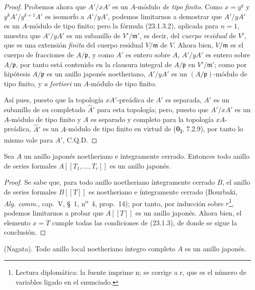 \begin{proof}
Probemos ahora que $A'/xA'$ es un $A$-módulo \emph{de tipo finito}. Como $x=y^q$
y $y^kA'/y^{k+1}A'$ es isomorfo a $A'/yA'$, podemos limitarnos a
demostrar que $A'/yA'$ es un $A$-módulo de tipo finito; pero la fórmula
(23.1.3.2), aplicada para $n=1$, muestra que $A'/yA'$ es un subanillo de
$V'/\mathfrak m'$, es decir, del \emph{cuerpo residual} de $V'$, que es una
extensión \emph{finita} del cuerpo residual $V/\mathfrak m$ de $V$. Ahora bien,
$V/\mathfrak m$ es el cuerpo de fracciones de $A/\mathfrak p$, y como
$A'$ es entero sobre $A$, $A'/yA'$ es entero sobre $A/\mathfrak p$, por tanto
está contenido en la clausura integral de $A/\mathfrak p$ en
$V'/\mathfrak m'$; como por hipótesis $A/\mathfrak p$ es un anillo
japonés noetheriano, $A'/yA'$ es un $(A/\mathfrak p)$-módulo de tipo finito,
y \emph{a fortiori} un $A$-módulo de tipo finito.

Así pues, puesto que la topología $xA'$-preádica de $A'$ es separada, $A'$ es un
subanillo de su completado $\widehat A'$ para esta topología; pero, puesto que
$A'/xA'$ es un $A$-módulo de tipo finito y $A$ es separado y completo para
la topología $xA$-preádica, $\widehat A'$ es un $A$-módulo de tipo finito en
virtud de (\textbf{0}\textsubscript{I}, 7.2.9), por tanto lo mismo vale para $A'$, C.Q.D.
\end{proof}

\begin{corollary}[23.1.4]
\label{0.23.1.4-es}
Sea $A$ un anillo japonés noetheriano e íntegramente cerrado. Entonces todo
anillo de series formales $A[[T_1,\ldots,T_r]]$ es un anillo japonés.
\end{corollary}

\begin{proof}
Se sabe que, para todo anillo noetheriano íntegramente cerrado $B$, el anillo de
series formales $B[[T]]$ es noetheriano e íntegramente cerrado (Bourbaki,
\emph{Alg. comm.}, cap.~V, §~1, n\textsuperscript{o}~4, prop.~14); por
tanto, por inducción sobre $r$\footnote{Lectura diplomática: la fuente imprime n; se corrige a r, que es el número de variables ligado en el enunciado.}, podemos limitarnos a probar que $A[[T]]$ es un anillo
japonés. Ahora bien, el elemento $x=T$ cumple todas las condiciones de (23.1.3), de donde
se sigue la conclusión.
\end{proof}

\begin{theorem}[23.1.5]
\label{0.23.1.5-es}
\textnormal{(Nagata).} Todo anillo local noetheriano íntegro \textup{completo} $A$ es
un anillo japonés.
\end{theorem}

